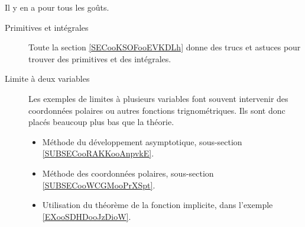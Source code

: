         \label{THEMEooLTCIooGDIPnF}

Il y en a pour tous les goûts.

\begin{description}
    \item[Primitives et intégrales]
        Toute la section \ref{SECooKSOFooEVKDLh} donne des trucs et astuces pour trouver des primitives et des intégrales.
    \item[Limite à deux variables]

        Les exemples de limites à plusieurs variables font souvent intervenir des coordonnées polaires ou autres fonctions trignométriques. Ils sont donc placés beaucoup plus bas que la théorie.
        \begin{itemize}
            \item Méthode du développement asymptotique, sous-section \ref{SUBSECooRAKKooAnpvkE}.
            \item Méthode des coordonnées polaires, sous-section \ref{SUBSECooWCGMooPrXSpt}.
            \item Utilisation du théorème de la fonction implicite, dans l'exemple \ref{EXooSDHDooJzDioW}.
        \end{itemize}

\end{description}
